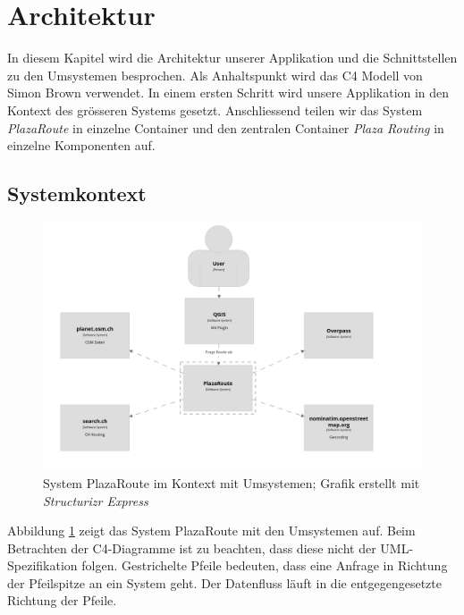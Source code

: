 
\section{Architektur}
\label{sec:Architektur}

In diesem Kapitel wird die Architektur unserer Applikation und die Schnittstellen zu den Umsystemen besprochen. Als Anhaltspunkt wird das C4 Modell \cite{c4model} von Simon Brown verwendet. In einem ersten Schritt wird unsere Applikation in den Kontext des grösseren Systems gesetzt. Anschliessend teilen wir das System \emph{PlazaRoute} in einzelne Container und den zentralen Container \emph{Plaza Routing} in einzelne Komponenten auf.

\subsection{Systemkontext}
\label{architektur:Systemkontext}

\begin{figure}[ht]
    \centering
    \includegraphics[width=1\linewidth]{projectdoc/img/system-context_diagram.png}
    \caption[System Kontext Diagramm]{System PlazaRoute im Kontext mit Umsystemen; Grafik erstellt mit \emph{Structurizr Express}\cite{structurizr}}
    \label{fig:system_context_diagram}
\end{figure}

Abbildung \ref{fig:system_context_diagram} zeigt das System PlazaRoute mit den Umsystemen auf. Beim Betrachten der C4-Diagramme ist zu beachten, dass diese nicht der \acs{UML}-Spezifikation folgen. Gestrichelte Pfeile bedeuten, dass eine Anfrage in Richtung der Pfeilspitze an ein System geht. Der Datenfluss läuft in die entgegengesetzte Richtung der Pfeile.


